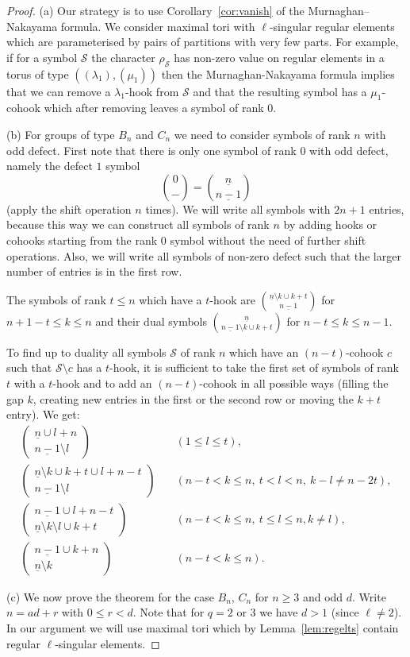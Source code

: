\documentclass{ert-l}
\newcommand{\cS}{{\mathcal{S}}}
\newcommand{\ul}[1]{\underline{#1}}
\newcommand{\sy}[2]{\ensuremath{\left(\begin{array}{c}{#1}\\{#2}\end{array}\right)}}
\let\la=\lambda
\let\sm=\setminus
\let\sys=\binom
\theoremstyle{definition}
\theoremstyle{remark}
\begin{document}
\begin{proof}
(a) Our strategy is to use Corollary~\ref{cor:vanish} of the Murnaghan--Nakayama
formula. We consider maximal tori with $\ell$-singular regular
elements which are parameterised by pairs of partitions with very few
parts. For example, if for a symbol $\cS$ the character $\rho_\cS$ has
non-zero value on regular elements in a torus of type $((\la_1),(\mu_1))$
then the Murnaghan-Nakayama formula implies that we can remove a $\la_1$-hook
from $\cS$ and that the resulting symbol has a $\mu_1$-cohook which after
removing leaves a symbol of rank $0$.

(b) For groups of type $B_n$ and $C_n$ we need to consider symbols of rank
$n$ with odd defect. First note that there is only one symbol of rank $0$
with odd defect, namely the defect $1$ symbol
\[\sys{0}{-} = \sys{\ul{n}}{\ul{n-1}}\]
(apply the shift operation $n$ times). We will write
all symbols with $2n+1$ entries, because this way we can construct all
symbols of rank $n$ by adding hooks or cohooks starting from the rank $0$
symbol without the need of further shift operations. Also, we will write
all symbols of non-zero defect such that the larger number of entries
is in the first row.

The symbols of rank $t \leq n$ which have a $t$-hook are
$\sys{\ul{n}\sm k\cup k+t}{\ul{n-1}}$ for $n+1-t \leq k \leq n$ and their
dual symbols $\sys{\ul{n}}{\ul{n-1}\sm k\cup k+t}$ for $n-t\leq k\leq n-1$.

To find up to duality all symbols $\cS$ of rank $n$ which have an $(n-t)$-cohook
$c$ such that $\cS \sm c$ has a $t$-hook, it is sufficient to take the first
set of symbols of rank $t$ with a $t$-hook and to add an $(n-t)$-cohook in
all possible ways (filling the gap $k$, creating new entries in the first
or the second row or moving the $k+t$ entry). We get:
\[\begin{aligned}
  \sy{\ul{n}\cup l+n}{\ul{n-1}\sm l}&\quad (1\leq l\leq t),\\
  \sy{\ul{n}\sm k \cup k+t \cup l+n-t}{\ul{n-1}\sm l}&\quad (n-t< k \leq n,\
    t< l < n,\  k-l \neq n-2t),\\
  \sy{\ul{n-1}\cup l+n-t}{\ul{n}\sm k \sm l \cup k+t}&\quad
    (n-t< k \leq n,\ t \leq l \leq n, k\neq l),\\
  \sy{\ul{n-1}\cup k+n}{\ul{n}\sm k}&\quad (n-t< k \leq n).
\end{aligned}\]

(c) We now prove the theorem for the case $B_n$, $C_n$ for $n\geq 3$
and odd $d$. Write $n = ad+r$ with $0\leq r <d$. Note that for $q=2$ or $3$
we have $d > 1$ (since $\ell \neq 2$). In our argument we will use maximal tori
which by Lemma~\ref{lem:regelts} contain regular $\ell$-singular elements.


\end{proof}
\end{document}
